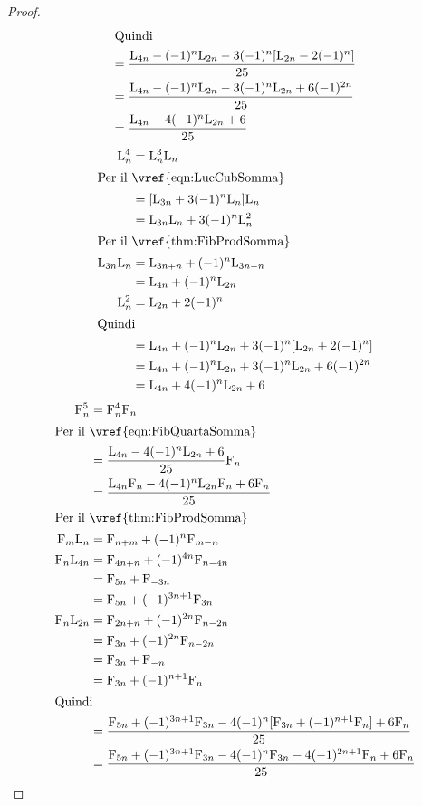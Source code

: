 \begin{proof}
\begin{align*}
\intertext{Quindi}
={}&\dfrac{\mathrm{L}_{4n}-(-1)^n\mathrm{L}_{2n}-3(-1)^n[\mathrm{L}_{2n}-2(-1)^n]}{25}\\
={}&\dfrac{\mathrm{L}_{4n}-(-1)^n\mathrm{L}_{2n}-3(-1)^n\mathrm{L}_{2n}+6(-1)^{2n}}{25}\\
={}&\dfrac{\mathrm{L}_{4n}-4(-1)^n\mathrm{L}_{2n}+6}{25}\\
\end{align*}
\begin{align*}
\Luc{n}^4={}&\Luc{n}^3\Luc{n}\\
\intertext{Per il~\vref{eqn:LucCubSomma}}
={}&[\Luc{3n}+3(-1)^n\Luc{n}]\Luc{n}\\
={}&\Luc{3n}\Luc{n}+3(-1)^n\Luc{n}^2\\
\intertext{Per il~\vref{thm:FibProdSomma}}
\Luc{3n}\Luc{n}={}&\Luc{3n+n}+(-1)^n\Luc{3n-n}\\
={}&\Luc{4n}+(-1)^n\Luc{2n}\\
\Luc{n}^2={}&\Luc{2n}+2(-1)^n\\
\intertext{Quindi}
={}&\Luc{4n}+(-1)^n\Luc{2n}+3(-1)^n[\Luc{2n}+2(-1)^n]\\
={}&\Luc{4n}+(-1)^n\Luc{2n}+3(-1)^n\Luc{2n}+6(-1)^{2n}\\
={}&\Luc{4n}+4(-1)^n\Luc{2n}+6\\
\end{align*}
\begin{align*}
	\Fib{n}^5={}&\Fib{n}^4\Fib{n}\\
	\intertext{Per il~\vref{eqn:FibQuartaSomma}}
	={}&\dfrac{\Luc{4n}-4(-1)^n\Luc{2n}+6}{25}\Fib{n}\\
	={}&\dfrac{\Luc{4n}\Fib{n}-4(-1)^n\Luc{2n}\Fib{n}+6\Fib{n}}{25}\\
	\intertext{Per il~\vref{thm:FibProdSomma}}
	\Fib{m}\Luc{n}={}&\Fib{n+m}+(-1)^n\Fib{m-n}\\
	\Fib{n}\Luc{4n}={}&\Fib{4n+n}+(-1)^{4n}\Fib{n-4n}\\
	={}&\Fib{5n}+\Fib{-3n}\\
	={}&\Fib{5n}+(-1)^{3n+1}\Fib{3n}\\
	\Fib{n}\Luc{2n}={}&\Fib{2n+n}+(-1)^{2n}\Fib{n-2n}\\
	={}&\Fib{3n}+(-1)^{2n}\Fib{n-2n}\\
	={}&\Fib{3n}+\Fib{-n}\\
	={}&\Fib{3n}+(-1)^{n+1}\Fib{n}\\
	\intertext{Quindi}
	={}&\dfrac{\Fib{5n}+(-1)^{3n+1}\Fib{3n}-4(-1)^n[\Fib{3n}+(-1)^{n+1}\Fib{n}]+6\Fib{n}}{25}\\
	={}&\dfrac{\Fib{5n}+(-1)^{3n+1}\Fib{3n}-4(-1)^n\Fib{3n}-4(-1)^{2n+1}\Fib{n}+6\Fib{n}}{25}\\

\end{align*}
\end{proof}
